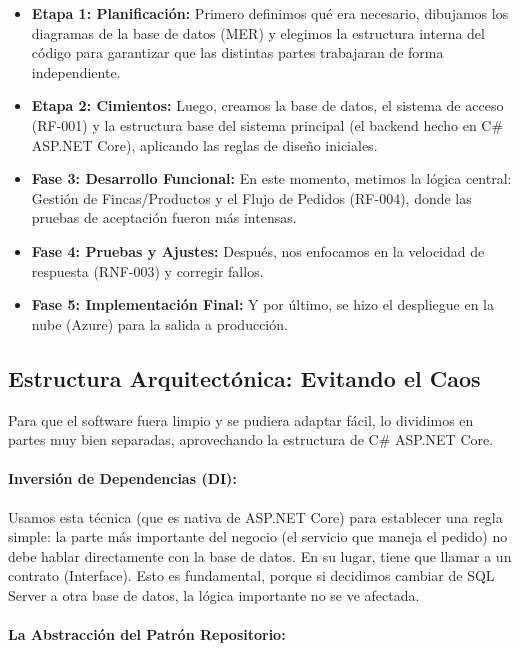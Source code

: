 \begin{itemize}
\item \textbf{Etapa 1: Planificación:} Primero definimos qué era necesario, dibujamos los diagramas de la base de datos (MER) y elegimos la estructura interna del código para garantizar que las distintas partes trabajaran de forma independiente.

\item \textbf{Etapa 2: Cimientos:} Luego, creamos la base de datos, el sistema de acceso (RF-001) y la estructura base del sistema principal (el backend hecho en C\# ASP.NET Core), aplicando las reglas de diseño iniciales.

\item \textbf{Fase 3: Desarrollo Funcional:} En este momento, metimos la lógica central: Gestión de Fincas/Productos y el Flujo de Pedidos (RF-004), donde las pruebas de aceptación fueron más intensas.

\item \textbf{Fase 4: Pruebas y Ajustes:} Después, nos enfocamos en la velocidad de respuesta (RNF-003) y corregir fallos.

\item \textbf{Fase 5: Implementación Final:} Y por último, se hizo el despliegue en la nube (Azure) para la salida a producción.
\end{itemize}

\subsection{Estructura Arquitectónica: Evitando el Caos}

Para que el software fuera limpio y se pudiera adaptar fácil, lo dividimos en partes muy bien separadas, aprovechando la estructura de C\# ASP.NET Core.

\paragraph{Inversión de Dependencias (DI):} Usamos esta técnica (que es nativa de ASP.NET Core) para establecer una regla simple: la parte más importante del negocio (el servicio que maneja el pedido) no debe hablar directamente con la base de datos. En su lugar, tiene que llamar a un contrato (Interface). Esto es fundamental, porque si decidimos cambiar de SQL Server a otra base de datos, la lógica importante no se ve afectada.

\paragraph{La Abstracción del Patrón Repositorio:}

